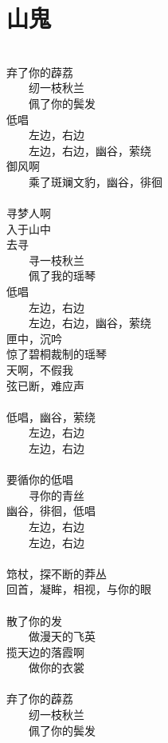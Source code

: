 \section{山鬼}
\leftskip=25mm
\noindent \\
弃了你的薜荔 \\
　　纫一枝秋兰 \\
　　佩了你的鬓发　\\
低唱 \\
　　左边，右边 \\
　　左边，右边，幽谷，萦绕 \\
御风啊 \\
　　乘了斑斓文豹，幽谷，徘徊 \\
\\
寻梦人啊 \\
入于山中 \\
去寻 \\
　　寻一枝秋兰 \\
　　佩了我的瑶琴 \\
低唱 \\
　　左边，右边 \\
　　左边，右边，幽谷，萦绕 \\
匣中，沉吟 \\
惊了碧桐裁制的瑶琴 \\
天啊，不假我 \\
弦已断，难应声 \\
\\
低唱，幽谷，萦绕 \\
　　左边，右边 \\
　　左边，右边 \\
\\
要循你的低唱 \\
　　寻你的青丝 \\
幽谷，徘徊，低唱 \\
　　左边，右边 \\
　　左边，右边 \\
\\
筇杖，探不断的莽丛 \\
回首，凝眸，相视，与你的眼 \\
\\
散了你的发 \\
　　做漫天的飞英 \\
揽天边的落霞啊 \\
　　做你的衣裳 \\
\\
弃了你的薜荔 \\
　　纫一枝秋兰 \\
　　佩了你的鬓发 \\
